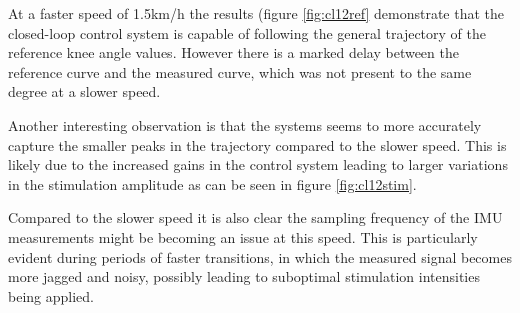 
At a faster speed of 1.5km/h the results (figure \ref{fig:cl12ref} demonstrate that the closed-loop control system is capable of following the general trajectory of the reference knee angle values. However there is a marked delay between the reference curve and the measured curve, which was not present to the same degree at a slower speed.

Another interesting observation is that the systems seems to more accurately capture the smaller peaks in the trajectory compared to the slower speed. This is likely due to the increased gains in the control system leading to larger variations in the stimulation amplitude as can be seen in figure \ref{fig:cl12stim}.

Compared to the slower speed it is also clear the sampling frequency of the IMU measurements might be becoming an issue at this speed. This is particularly evident during periods of faster transitions, in which the measured signal becomes more jagged and noisy, possibly leading to suboptimal stimulation intensities being applied. 



